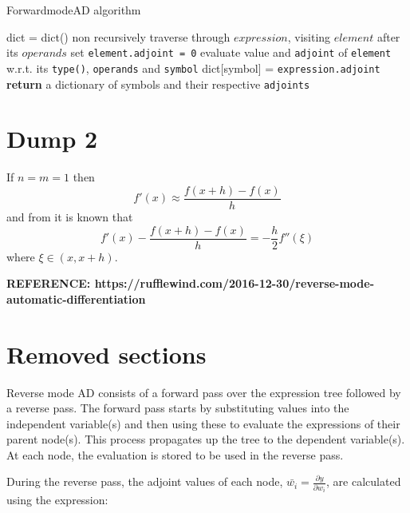 \documentclass{article}
\begin{document}
\begin{algorithm}
\caption{ForwardmodeAD algorithm}\label{forwardAD}
\begin{algorithmic}[1]
\State dict = dict()
\State non recursively traverse through $expression$, visiting $element$ after its $operands$
    \State set \verb|element.adjoint = 0|
    \State evaluate value and \verb|adjoint| of \verb|element| w.r.t. its \verb|type()|, \verb|operands| and \verb|symbol|
    \State dict[symbol] = \verb|expression.adjoint|
    \EndFor
\EndFor
\State \textbf{return} a dictionary of symbols and their respective \verb|adjoints|
\EndProcedure
\end{algorithmic}
\end{algorithm}



\section{Dump 2}

If $n=m=1$ then
\begin{equation*}
    f'(x) \approx \frac{f(x+h)-f(x)}{h}
\end{equation*}
and from \cite{quarteroni} it is known that
\begin{equation*}
    f'(x) - \frac{f(x+h)-f(x)}{h} = - \frac{h}{2} f''(\xi)
\end{equation*}
where $\xi \in (x, x+h)$.

\textbf{REFERENCE: https://rufflewind.com/2016-12-30/reverse-mode-automatic-differentiation}



\section{Removed sections}


Reverse mode AD consists of a forward pass over the expression tree followed by a reverse pass. The forward pass starts by substituting values into the independent variable(s) and then using these to evaluate the expressions of their parent node(s). This process propagates up the tree to the dependent variable(s). At each node, the evaluation is stored to be used in the reverse pass.

During the reverse pass, the adjoint values of each node, $\bar{w_i} = \frac{\partial{y}}{\partial{w_i}}$, are calculated using the expression:
\end{document}
